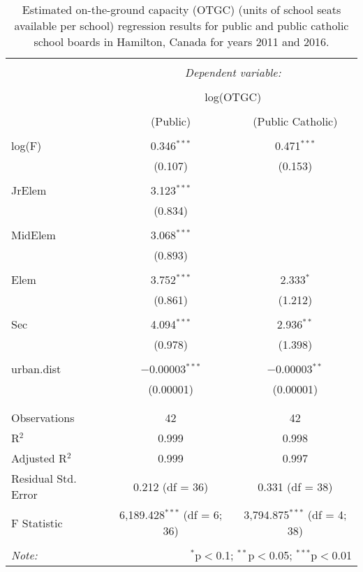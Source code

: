 
\begin{table}[!htbp] \centering 
  \caption{Estimated on-the-ground capacity (OTGC) (units of school seats available per school) regression results for public and public catholic school boards in Hamilton, Canada for years 2011 and 2016.} 
  \label{Tab1-OTGC} 
\begin{tabular}{@{\extracolsep{5pt}}lcc} 
\\[-1.8ex]\hline 
\hline \\[-1.8ex] 
 & \multicolumn{2}{c}{\textit{Dependent variable:}} \\ 
\\[-1.8ex] & \multicolumn{2}{c}{log(OTGC)} \\ 
\\[-1.8ex] & (Public) & (Public Catholic)\\ 
\hline \\[-1.8ex] 
 log(F) & 0.346$^{***}$ & 0.471$^{***}$ \\ 
  & (0.107) & (0.153) \\ 
  & & \\ 
 JrElem & 3.123$^{***}$ &  \\ 
  & (0.834) &  \\ 
  & & \\ 
 MidElem & 3.068$^{***}$ &  \\ 
  & (0.893) &  \\ 
  & & \\ 
 Elem & 3.752$^{***}$ &  2.333$^{*}$\\ 
  & (0.861) & (1.212) \\ 
  & & \\ 
 Sec & 4.094$^{***}$ &  2.936$^{**}$ \\ 
  & (0.978) & (1.398) \\ 
  & & \\ 
 urban.dist & $-$0.00003$^{***}$ & $-$0.00003$^{**}$ \\ 
  & (0.00001) & (0.00001) \\ 
  & & \\ 
\hline \\[-1.8ex] 
Observations & 42 & 42 \\ 
R$^{2}$ & 0.999 & 0.998 \\ 
Adjusted R$^{2}$ & 0.999 & 0.997 \\ 
Residual Std. Error & 0.212 (df = 36) & 0.331 (df = 38) \\ 
F Statistic & 6,189.428$^{***}$ (df = 6; 36) & 3,794.875$^{***}$ (df = 4; 38) \\ 
\hline 
\hline \\[-1.8ex] 
\textit{Note:}  & \multicolumn{2}{r}{$^{*}$p$<$0.1; $^{**}$p$<$0.05; $^{***}$p$<$0.01} \\ 
\end{tabular} 
\end{table} 
